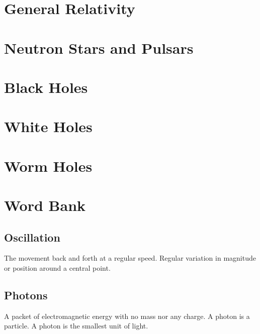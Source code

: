 \documentclass{article}
\begin{document}
\section{General Relativity}\label{sec:generalrelativity}




\section{Neutron Stars and Pulsars}




\section{Black Holes}




\section{White Holes}




\section{Worm Holes}




\section{Word Bank}
\subsection{Oscillation}\label{sec:oscillation}
The movement back and forth at a regular speed. Regular variation in magnitude or position around a central point.

\subsection{Photons}\label{sec:photons}
A packet of electromagnetic energy with no mass nor any charge. A photon is a particle. A photon is the smallest unit of light.
\end{document}
